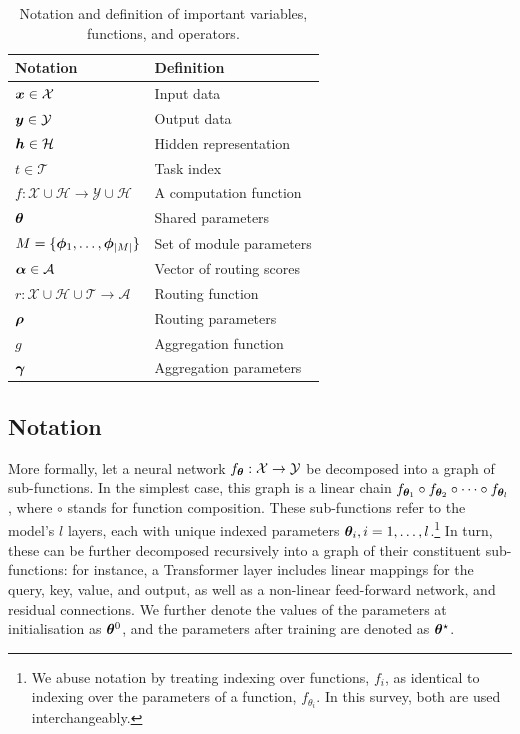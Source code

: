 \documentclass[10pt]{article} %
\begin{document}
\begin{table}[t]
    \centering
    \begin{tabular}{ll}
    \toprule
    Notation & Definition \\
    \midrule
        ${\bm{x}} \in \mathcal{X}$ & Input data \\
        ${\bm{y}} \in \mathcal{Y}$ & Output data \\
        ${\bm{h}} \in \mathcal{H}$ & Hidden representation \\
        $t \in \mathcal{T}$ & Task index \\
        $f : \mathcal{X} \cup \mathcal{H} \rightarrow \mathcal{Y} \cup \mathcal{H}$ & A computation function \\
        ${\bm{\theta}} $ & Shared parameters \\
        $M = \{{\bm{\phi}}_1, \dots, {\bm{\phi}}_{|M|}\}$ & Set of module parameters \\
        ${\bm{\alpha}} \in \mathcal{A}$ & Vector of routing scores \\
        $r : \mathcal{X} \cup \mathcal{H} \cup \mathcal{T} \rightarrow \mathcal{A}$ & Routing function \\
        ${\bm{\rho}}$ & Routing parameters \\
        $g$ & Aggregation function \\
        ${\bm{\gamma}}$ & Aggregation parameters \\
    \bottomrule
    \end{tabular}
    \caption{Notation and definition of important variables, functions, and operators.}
    \label{tab:notation}
\end{table}

\subsection{Notation} 
\label{ssec:notation}
More formally, let a neural network $f_{{\bm{\theta}}}: \mathcal{X} \rightarrow \mathcal{Y}$ be decomposed into a graph of sub-functions. In the simplest case, this graph is a linear chain $f_{{\bm{\theta}}_1} \circ f_{{\bm{\theta}}_2} \circ \dots \circ f_{{\bm{\theta}}_l}$, where $\circ$ stands for function composition. These sub-functions refer to the model's $l$ layers, each with unique indexed parameters ${\bm{\theta}}_i,i=1,\ldots,l$.\footnote{We abuse notation by treating indexing over functions, $f_i$, as identical to indexing over the parameters of a function, $f_{\theta_i}$. In this survey, both are used interchangeably.} In turn, these can be further decomposed recursively into a graph of their constituent sub-functions: for instance, a Transformer layer \citep{Vaswani2017} includes linear mappings for the query, key, value, and output, as well as a non-linear feed-forward network, and residual connections. We further denote the values of the parameters at initialisation as ${\bm{\theta}}^{0}$, and the parameters after training are denoted as ${\bm{\theta}}^\star$. 
\end{document}
